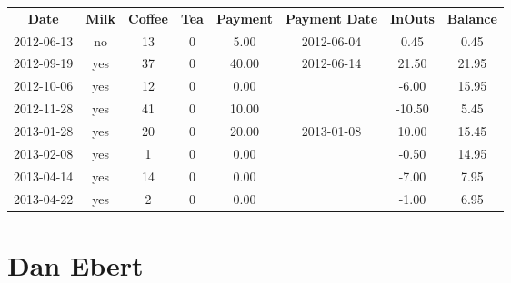 \begin{center}
\begin{tabular}{cccccccc}
\textbf{Date} & \textbf{Milk} & \textbf{Coffee} & \textbf{Tea} & \textbf{Payment} & \textbf{Payment Date} & \textbf{InOuts} & \textbf{Balance} \\
2012-06-13 & no & 13 & 0 &  5.00 & 2012-06-04 &   0.45 &  0.45\\ 
2012-09-19 & yes & 37 & 0 & 40.00 & 2012-06-14 &  21.50 & 21.95\\ 
2012-10-06 & yes & 12 & 0 &  0.00 &  &  -6.00 & 15.95\\ 
2012-11-28 & yes & 41 & 0 & 10.00 &  & -10.50 &  5.45\\ 
2013-01-28 & yes & 20 & 0 & 20.00 & 2013-01-08 &  10.00 & 15.45\\ 
2013-02-08 & yes &  1 & 0 &  0.00 &  &  -0.50 & 14.95\\ 
2013-04-14 & yes & 14 & 0 &  0.00 &  &  -7.00 &  7.95\\ 
2013-04-22 & yes &  2 & 0 &  0.00 &  &  -1.00 &  6.95
\end{tabular}
\end{center}

\section{Dan Ebert}


